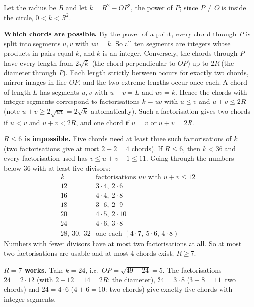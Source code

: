 Let the radius be $R$ and let $k=R^2-OP^2$, the power of $P$; since $P\ne O$ is inside the circle, $0<k<R^2$.

\textbf{Which chords are possible.} By the power of a point, every chord through $P$ is split into segments $u,v$ with $uv=k$. So all ten segments are integers whose products in pairs equal $k$, and $k$ is an integer. Conversely, the chords through $P$ have every length from $2\sqrt k$ (the chord perpendicular to $OP$) up to $2R$ (the diameter through $P$). Each length strictly between occurs for exactly two chords, mirror images in line $OP$, and the two extreme lengths occur once each. A chord of length $L$ has segments $u,v$ with $u+v=L$ and $uv=k$. Hence the chords with integer segments correspond to factorisations $k=uv$ with $u\le v$ and $u+v\le2R$ (note $u+v\ge2\sqrt{uv}=2\sqrt k$ automatically). Such a factorisation gives two chords if $u<v$ and $u+v<2R$, and one chord if $u=v$ or $u+v=2R$.

\textbf{$R\le6$ is impossible.} Five chords need at least three such factorisations of $k$ (two factorisations give at most $2+2=4$ chords). If $R\le6$, then $k<36$ and every factorisation used has $v\le u+v-1\le11$. Going through the numbers below $36$ with at least five divisors:
\[
\begin{array}{c|c}
k & \text{factorisations } uv \text{ with } u+v\le12\\\hline
12 & 3\cdot4,\ 2\cdot6\\
16 & 4\cdot4,\ 2\cdot8\\
18 & 3\cdot6,\ 2\cdot9\\
20 & 4\cdot5,\ 2\cdot10\\
24 & 4\cdot6,\ 3\cdot8\\
28,\ 30,\ 32 & \text{one each } (4\cdot7,\ 5\cdot6,\ 4\cdot8)
\end{array}
\]
Numbers with fewer divisors have at most two factorisations at all. So at most two factorisations are usable and at most $4$ chords exist; $R\ge7$.

\textbf{$R=7$ works.} Take $k=24$, i.e.\ $OP=\sqrt{49-24}=5$. The factorisations $24=2\cdot12$ (with $2+12=14=2R$: the diameter), $24=3\cdot8$ ($3+8=11$: two chords) and $24=4\cdot6$ ($4+6=10$: two chords) give exactly five chords with integer segments.

